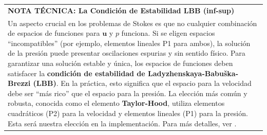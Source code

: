 \begin{center}
\begin{tabular}{|p{}|}
\hline
\textbf{NOTA TÉCNICA: La Condición de Estabilidad LBB (inf-sup)} \\
Un aspecto crucial en los problemas de Stokes es que no cualquier combinación de espacios de funciones para \(\bm{u}\) y \(p\) funciona. Si se eligen espacios ``incompatibles'' (por ejemplo, elementos lineales P1 para ambos), la solución de la presión puede presentar oscilaciones espurias y sin sentido físico.
Para garantizar una solución estable y única, los espacios de funciones deben satisfacer la \textbf{condición de estabilidad de Ladyzhenskaya-Babuška-Brezzi (LBB)}. En la práctica, esto significa que el espacio para la velocidad debe ser ``más rico'' que el espacio para la presión. La elección más común y robusta, conocida como el elemento \textbf{Taylor-Hood}, utiliza elementos cuadráticos (P2) para la velocidad y elementos lineales (P1) para la presión. Esta será nuestra elección en la implementación. Para más detalles, ver \cite{Donea2003}. \\
\hline
\end{tabular}
\end{center}